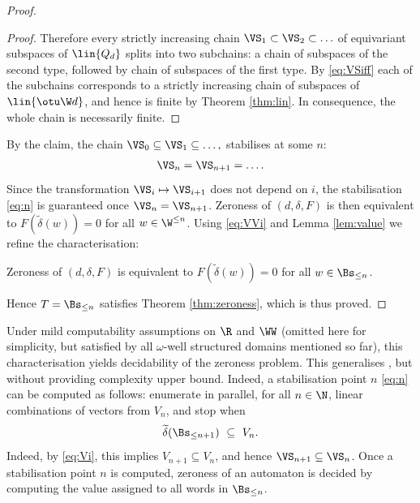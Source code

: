 \begin{proof}
\begin{proof}
Therefore every strictly increasing chain $\VS_1 \subset \VS_2 \subset \ldots$ 
of equivariant subspaces of $\lin{Q_d}$ splits into two subchains:
a chain of subspaces of the second type, followed by chain of subspaces of the first type.
By \eqref{eq:VSiff} each of the subchains corresponds to a strictly increasing chain
of subspaces of $\lin{\otu \W d}$, and hence is finite by Theorem \ref{thm:lin}.
In consequence, the whole chain is necessarily finite.
\end{proof}
%
By the claim, the chain 
$
\VS_0  \subseteq  \VS_1  \subseteq \ldots,
$
stabilises at some $n$:
%
\begin{align} \label{eq:n}
\VS_n  =  \VS_{n+1}  =  \ldots.
\end{align}
%
Since the transformation $\VS_i \mapsto \VS_{i+1}$ does not depend on $i$, the
stabilisation \eqref{eq:n} is guaranteed once $\VS_n = \VS_{n+1}$.
Zeroness of $(d, \delta, F)$ is then equivalent to
$F(\widetilde\delta(w)) = 0$ for all $w\in\W^{\leq n}$.
Using \eqref{eq:VVi} and Lemma \ref{lem:value} we refine the characterisation:
%
\begin{claim} \label{claim:zeroness}
Zeroness of $(d, \delta, F)$ is equivalent to
$F(\widetilde\delta(w)) = 0$ for all $w\in\Bs_{\leq n}$.
\end{claim}
%
Hence $T = \Bs_{\leq n}$ satisfies 
Theorem \ref{thm:zeroness}, which is thus proved.
\end{proof}

\begin{remark} \label{rem:zeroness}
\rm
Under mild computability assumptions on $\R$ and $\WW$ (omitted here for simplicity, but satisfied
by all $\omega$-well structured domains mentioned so far),
this characterisation yields decidability of the zeroness problem.
This generalises \cite[Lemma VIII.1]{BKM21}, but
without providing complexity upper bound.
Indeed, a stabilisation point $n$ \eqref{eq:n} can be computed as follows:
enumerate in parallel, for all $n\in\N$, linear combinations of vectors from $V_n$,
and stop when 
\[
\widetilde\delta(\Bs_{\leq n+1}) \ \subseteq \ V_n.
\]
Indeed, %
by \eqref{eq:Vi}, this implies $V_{n+1} \subseteq V_n$, and hence
$\VS_{n+1}\subseteq\VS_n$.
%
Once a stabilisation point $n$ is computed, zeroness of an automaton is 
decided by computing the value assigned to all words in $\Bs_{\leq n}$.
\end{remark}




